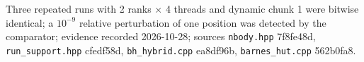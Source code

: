 Three repeated runs with 2 ranks $\times$ 4 threads and dynamic chunk 1 were bitwise identical; a $10^{-9}$ relative perturbation of one position was detected by the comparator; evidence recorded 2026-10-28; sources \texttt{nbody.hpp} 7f8fe48d, \texttt{run\_support.hpp} cfedf58d, \texttt{bh\_hybrid.cpp} ea8df96b, \texttt{barnes\_hut.cpp} 562b0fa8.
